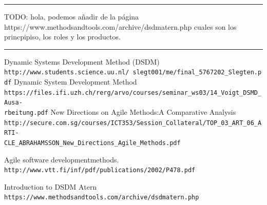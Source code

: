 \documentclass[12pt,a4paper]{article}
\begin{document}
{\color{red} \rule{\linewidth}{0.5mm} }
{\color{blue} TODO: hola, podemos añadir de la página https://www.methodsandtools.com/archive/dsdmatern.php cuales son los princpipiso, los roles y los productos.}\\
{\color{red} \rule{\linewidth}{0.5mm} }

\begin{thebibliography}{9}

 Dynamic Systems Development Method (DSDM)
\\\texttt{http://www.students.science.uu.nl/~slegt001/me/final\_5767202\_Slegten.pdf}
Dynamic System Development Method
\\\texttt{https://files.ifi.uzh.ch/rerg/arvo/courses/seminar\_ws03/14\_Voigt\_DSMD\_Ausa-\\rbeitung.pdf}
New Directions on Agile Methods:A Comparative Analysis
\\\texttt{http://secure.com.sg/courses/ICT353/Session\_Collateral/TOP\_03\_ART\_06\_ARTI-\\CLE\_ABRAHAMSSON\_New\_Directions\_Agile\_Methods.pdf}

Agile software developmentmethods.
\\\texttt{http://www.vtt.fi/inf/pdf/publications/2002/P478.pdf}


Introduction to DSDM Atern
\\\texttt{https://www.methodsandtools.com/archive/dsdmatern.php}
\end{thebibliography}
\end{document}
